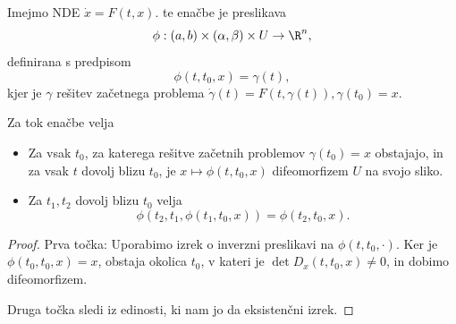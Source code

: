 Imejmo NDE $\dot{x} = F(t,x)$.
 te enačbe je preslikava
\[
  \phi: (a,b) \times (\alpha, \beta) \times U \to \R^n,
\]
definirana s predpisom
\[
  \phi(t, t_0, x) = \gamma(t),
\]
kjer je $\gamma$ rešitev začetnega problema $\dot{\gamma}(t) = F(t, \gamma(t)),
\gamma(t_0) = x$.

\begin{trditev}
  Za tok enačbe velja
  \begin{itemize}
  \item Za vsak $t_0$, za katerega rešitve začetnih problemov $\gamma(t_0) = x$
	obstajajo, in za vsak $t$ dovolj blizu $t_0$, je $x \mapsto \phi(t, t_0, x)$
	difeomorfizem $U$ na svojo sliko.
  \item Za $t_1, t_2$ dovolj blizu $t_0$ velja
	\[
	  \phi(t_2, t_1, \phi(t_1, t_0, x)) = \phi(t_2, t_0, x).
	\]
  \end{itemize}
\end{trditev}

\begin{proof}
  Prva točka:
  Uporabimo izrek o inverzni preslikavi na $\phi(t, t_0, \cdot)$.
  Ker je $\phi(t_0, t_0, x) = x$, obstaja okolica $t_0$, v kateri je $\det
  D_x(t, t_0,x) \ne 0$, in dobimo difeomorfizem.

  Druga točka sledi iz edinosti, ki nam jo da eksistenčni izrek.
\end{proof}

